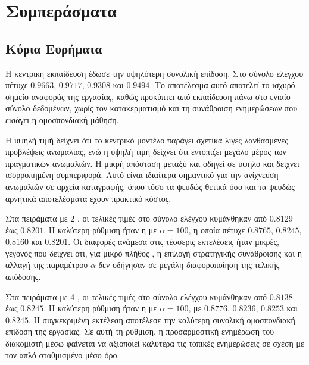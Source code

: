 \chapter{Συμπεράσματα}

\section{Κύρια Ευρήματα}

Η κεντρική εκπαίδευση έδωσε την υψηλότερη συνολική επίδοση. Στο σύνολο ελέγχου πέτυχε  \(0.9663\),  \(0.9717\),  \(0.9308\) και  \(0.9494\). Το αποτέλεσμα αυτό αποτελεί το ισχυρό σημείο αναφοράς της εργασίας, καθώς προκύπτει από εκπαίδευση πάνω στο ενιαίο σύνολο δεδομένων, χωρίς τον κατακερματισμό και τη συνάθροιση ενημερώσεων που εισάγει η ομοσπονδιακή μάθηση.

Η υψηλή τιμή  δείχνει ότι το κεντρικό μοντέλο παράγει σχετικά λίγες λανθασμένες προβλέψεις ανωμαλίας, ενώ η υψηλή τιμή  δείχνει ότι εντοπίζει μεγάλο μέρος των πραγματικών ανωμαλιών. Η μικρή απόσταση μεταξύ  και  οδηγεί σε υψηλό  και δείχνει ισορροπημένη συμπεριφορά. Αυτό είναι ιδιαίτερα σημαντικό για την ανίχνευση ανωμαλιών σε αρχεία καταγραφής, όπου τόσο τα ψευδώς θετικά όσο και τα ψευδώς αρνητικά αποτελέσματα έχουν πρακτικό κόστος.

Στα πειράματα με 2 , οι τελικές τιμές  στο σύνολο ελέγχου κυμάνθηκαν από \(0.8129\) έως \(0.8201\). Η καλύτερη ρύθμιση ήταν η  με \(\alpha=100\), η οποία πέτυχε  \(0.8765\),  \(0.8245\),  \(0.8160\) και  \(0.8201\). Οι διαφορές ανάμεσα στις τέσσερις εκτελέσεις ήταν μικρές, γεγονός που δείχνει ότι, για μικρό πλήθος , η επιλογή στρατηγικής συνάθροισης και η αλλαγή της παραμέτρου \(\alpha\) δεν οδήγησαν σε μεγάλη διαφοροποίηση της τελικής απόδοσης.

Στα πειράματα με 4 , οι τελικές τιμές  στο σύνολο ελέγχου κυμάνθηκαν από \(0.8138\) έως \(0.8245\). Η καλύτερη ρύθμιση ήταν η  με \(\alpha=100\), με  \(0.8776\),  \(0.8236\),  \(0.8253\) και  \(0.8245\). Η συγκεκριμένη εκτέλεση αποτέλεσε την καλύτερη συνολική ομοσπονδιακή επίδοση της εργασίας. Σε αυτή τη ρύθμιση, η προσαρμοστική ενημέρωση του διακομιστή μέσω  φαίνεται να αξιοποιεί καλύτερα τις τοπικές ενημερώσεις σε σχέση με τον απλό σταθμισμένο μέσο όρο.

